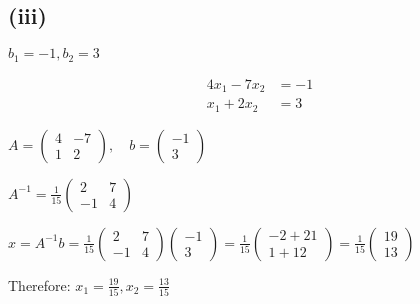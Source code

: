 \subsection*{(iii)} $b_1 = -1, b_2 = 3$

\begin{align}
	4x_1 - 7x_2 & = -1 \\
	x_1 + 2x_2  & = 3
\end{align}

$A = \begin{pmatrix}
	4 & -7 \\
	1 & 2
\end{pmatrix}, \quad b = \begin{pmatrix}
	-1 \\
	3
\end{pmatrix}$

$A^{-1} = \frac{1}{15}\begin{pmatrix}
	2 & 7 \\
	-1 & 4
\end{pmatrix}$

$x = A^{-1}b = \frac{1}{15}\begin{pmatrix}
	2 & 7 \\
	-1 & 4
\end{pmatrix}\begin{pmatrix}
	-1 \\
	3
\end{pmatrix} = \frac{1}{15}\begin{pmatrix}
	-2 + 21 \\
	1 + 12
\end{pmatrix} = \frac{1}{15}\begin{pmatrix}
	19 \\
	13
\end{pmatrix}$

Therefore: $x_1 = \frac{19}{15}, x_2 = \frac{13}{15}$